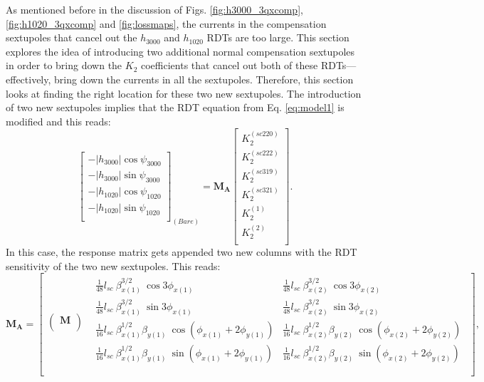 As mentioned before in the discussion of Figs. \ref{fig:h3000_3qxcomp}, \ref{fig:h1020_3qxcomp} and \ref{fig:lossmaps}, the currents in the compensation sextupoles that cancel out the $h_{3000}$ and $h_{1020}$ RDTs are too large. This section explores the idea of introducing two additional normal compensation sextupoles in order to bring down the $K_2$ coefficients that cancel out both of these RDTs---effectively, bring down the currents in all the sextupoles. Therefore, this section looks at finding the right location for these two new sextupoles. The introduction of two new sextupoles implies that the RDT equation from Eq. \ref{eq:model1} is modified and this reads:
\begin{equation}
    \begin{bmatrix}
        -|h_{3000}| \cos \psi_{3000} \\
        -|h_{3000}| \sin \psi_{3000} \\
        -|h_{1020}| \cos \psi_{1020} \\
        -|h_{1020}| \sin \psi_{1020} \\
        \end{bmatrix}_{(Bare)}
         =
        \boldsymbol{M_A}
        \begin{bmatrix}
        K_2^{(sc220)} \\
        K_2^{(sc222)}\\
        K_2^{(sc319)} \\
        K_2^{(sc321)}\\
        K_2^{(1)} \\
        K_2^{(2)}\\
        \end{bmatrix}.
        \label{eq:systemadd}
\end{equation}
In this case, the response matrix gets appended two new columns with the RDT sensitivity of the two new sextupoles. This reads:
\begin{equation}
    \boldsymbol{M_A} =
\begin{bmatrix}
\begin{pmatrix}  \boldsymbol{M} \\ \end{pmatrix} 
& \begin{matrix} \frac{1}{48} l_{sc} \: \beta^{3/2}_{x(1)} \: \cos 3\phi_{x(1)} & \frac{1}{48} l_{sc} \: \beta^{3/2}_{x(2)} \: \cos 3\phi_{x(2)} \\ 
 \frac{1}{48} l_{sc} \: \beta^{3/2}_{x(1)} \: \sin 3\phi_{x(1)} & \frac{1}{48} l_{sc} \: \beta^{3/2}_{x(2)} \: \sin 3\phi_{x(2)}  \\ 
 \frac{1}{16} l_{sc} \: \beta^{1/2}_{x(1)} \beta_{y(1)} \: \cos \left( \phi_{x(1)} + 2\phi_{y(1)} \right) &  \frac{1}{16} l_{sc} \: \beta^{1/2}_{x(2)} \beta_{y(2)} \: \cos \left( \phi_{x(2)} + 2\phi_{y(2)} \right)\\ 
 \frac{1}{16} l_{sc} \: \beta^{1/2}_{x(1)} \beta_{y(1)} \: \sin \left( \phi_{x(1)} + 2\phi_{y(1)} \right) &  \frac{1}{16} l_{sc} \: \beta^{1/2}_{x(2)} \beta_{y(2)} \: \sin \left( \phi_{x(2)} + 2\phi_{y(2)} \right)\\  
\end{matrix}\\
\end{bmatrix},
\end{equation}
